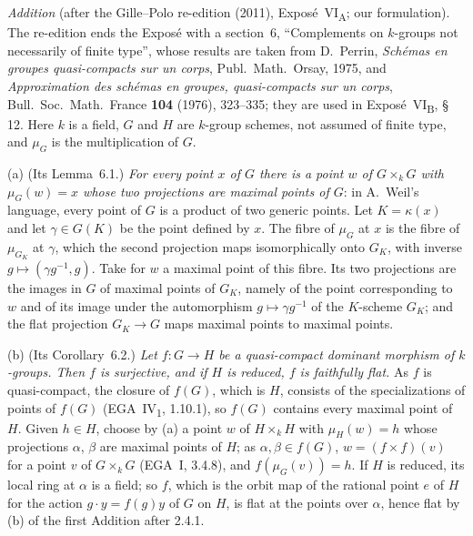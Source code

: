 
\medskip\noindent
\emph{Addition} (after the Gille--Polo re-edition (2011), Exposé~VI\textsubscript{A}; our
formulation). The re-edition ends the Exposé with a section~6, ``Complements on \(k\)-groups not
necessarily of finite type'', whose results are taken from D.~Perrin, \emph{Schémas en groupes
quasi-compacts sur un corps}, Publ.\ Math.\ Orsay, 1975, and \emph{Approximation des schémas en
groupes, quasi-compacts sur un corps}, Bull.\ Soc.\ Math.\ France \textbf{104} (1976), 323--335; they
are used in Exposé~VI\textsubscript{B}, \S\,12. Here \(k\) is a field, \(G\) and \(H\) are \(k\)-group
schemes, not assumed of finite type, and \(\mu_G\) is the multiplication of \(G\).

(a) (Its Lemma~6.1.) \emph{For every point \(x\) of \(G\) there is a point \(w\) of \(G\times_kG\)
with \(\mu_G(w)=x\) whose two projections are maximal points of \(G\)}: in A.~Weil's language, every
point of \(G\) is a product of two generic points. Let \(K=\kappa(x)\) and let \(\gamma\in G(K)\) be
the point defined by \(x\). The fibre of \(\mu_G\) at \(x\) is the fibre of \(\mu_{G_K}\) at \(\gamma\),
which the second projection maps isomorphically onto \(G_K\), with inverse
\(g\mapsto(\gamma g^{-1},g)\). Take for \(w\) a maximal point of this fibre. Its two projections are
the images in \(G\) of maximal points of \(G_K\), namely of the point corresponding to \(w\) and of its
image under the automorphism \(g\mapsto\gamma g^{-1}\) of the \(K\)-scheme \(G_K\); and the flat
projection \(G_K\to G\) maps maximal points to maximal points.

\label{cor:sga3-VIA-6.2}%
(b) (Its Corollary~6.2.) \emph{Let \(f\colon G\to H\) be a quasi-compact dominant morphism of
\(k\)-groups. Then \(f\) is surjective, and if \(H\) is reduced, \(f\) is faithfully flat.} As \(f\) is
quasi-compact, the closure of \(f(G)\), which is \(H\), consists of the specializations of points of
\(f(G)\) (EGA~IV\textsubscript{1}, 1.10.1), so \(f(G)\) contains every maximal point of \(H\). Given
\(h\in H\), choose by (a) a point \(w\) of \(H\times_kH\) with \(\mu_H(w)=h\) whose projections
\(\alpha\), \(\beta\) are maximal points of \(H\); as \(\alpha,\beta\in f(G)\), \(w=(f\times f)(v)\) for
a point \(v\) of \(G\times_kG\) (EGA~I, 3.4.8), and \(f(\mu_G(v))=h\). If \(H\) is reduced, its local
ring at \(\alpha\) is a field; so \(f\), which is the orbit map of the rational point \(e\) of \(H\) for
the action \(g\cdot y=f(g)y\) of \(G\) on \(H\), is flat at the points over \(\alpha\), hence flat by
(b) of the first Addition after 2.4.1.

